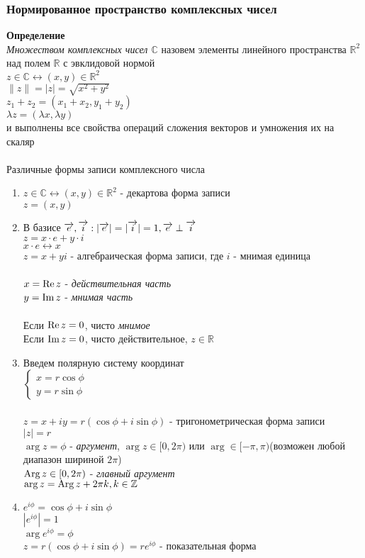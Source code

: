 \documentclass[12pt]{article}
\begin{document}
\subsubsection{Нормированное пространство комплексных чисел}
\textbf{Определение}\\
\textit{Множеством комплексных чисел $\mathbb{C}$} назовем элементы линейного пространства $\mathbb{R}^2$ над полем $\mathbb{R}$ с эвклидовой нормой\\
$z \in \mathbb{C} \leftrightarrow (x,y) \in \mathbb{R}^2$\\
$\|z\| = |z| = \sqrt{x^2+y^2}$\\
$z_1+z_2 = (x_1+x_2,y_1+y_2)$\\
$\lambda z = (\lambda x, \lambda y)$\\
и выполнены все свойства операций сложения векторов и умножения их на скаляр\\\\
Различные формы записи комплексного числа
\begin{enumerate}
    \item $z \in \mathbb{C} \leftrightarrow (x,y) \in \mathbb{R}^2$ - декартова форма записи\\
    $z = (x,y)$
    \item В базисе $\overrightarrow{e}, \overrightarrow{i}: |\overrightarrow{e}|=|\overrightarrow{i}|=1, \overrightarrow{e}\perp\overrightarrow{i}$\\
    $z = x\cdot e+y\cdot i$\\
    $x\cdot e \leftrightarrow x$\\
    $z = x + yi$ - алгебраическая форма записи, где $i$ - мнимая единица\\\\
    $x = \operatorname{Re} z$ - \textit{действительная часть}\\
    $y = \operatorname{Im} z$ - \textit{мнимая часть}\\\\
    Если $\operatorname{Re} z = 0$, чисто \textit{мнимое}\\
    Если $\operatorname{Im} z = 0$, чисто действительное, $z \in \mathbb{R}$
    \item Введем полярную систему координат\\
    $\left\{\begin{array}{l}
        x=r\cos \phi\\
        y=r\sin\phi
    \end{array}\right.$\\\\
    $z=x+iy = r(\cos\phi+i\sin\phi)$ - тригонометрическая форма записи\\
    $|z| = r$\\
    $\arg z = \phi$ - \textit{аргумент}, $\arg z \in [0,2\pi)$ или $\arg\in [-\pi,\pi)$(возможен любой диапазон шириной $2\pi$)\\
    $\operatorname{Arg} z \in [0,2\pi)$ - \textit{главный аргумент}\\
    $\arg z = \operatorname{Arg} z + 2\pi k, k \in \mathbb{Z}$
    \item $e^{i\phi}=\cos\phi + i\sin\phi$\\
    $|e^{i\phi}|=1$\\
    $\arg e^{i\phi} = \phi$\\
    $z = r(\cos\phi+i\sin\phi)=re^{i\phi}$ - показательная форма
\end{enumerate}
\end{document}
